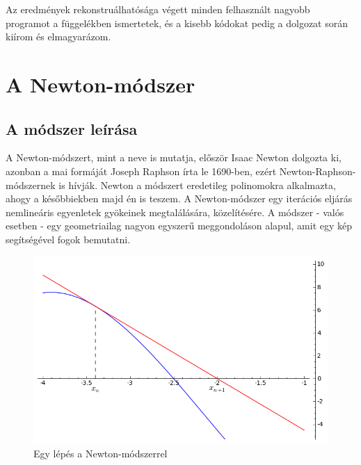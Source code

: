 \documentclass[a4paper,12pt]{report}
\begin{document}
		Az eredmények rekonstruálhatósága végett minden felhasznált nagyobb programot a függelékben ismertetek, és a kisebb kódokat pedig a dolgozat során kiírom és elmagyarázom.

%
%



	\chapter{A Newton-módszer}
    
    
        
        
		\section{A módszer leírása}
			A Newton-módszert, mint a neve is mutatja, először Isaac Newton dolgozta ki, azonban a mai formáját Joseph Raphson írta le 1690-ben, ezért Newton-Raphson-módszernek is hívják. Newton a módszert eredetileg polinomokra alkalmazta, ahogy a későbbiekben majd én is teszem. A Newton-módszer egy iterációs eljárás nemlineáris egyenletek gyökeinek megtalálására, közelítésére. A módszer - valós esetben - egy geometriailag nagyon egyszerű meggondoláson alapul, amit egy kép segítségével fogok bemutatni.
			
			\begin{figure}[ht]
				\centering
				\includegraphics[scale=0.55]{kep1.png}
				\caption{Egy lépés a Newton-módszerrel}\label{k1}
			\end{figure}
			
\end{document}
